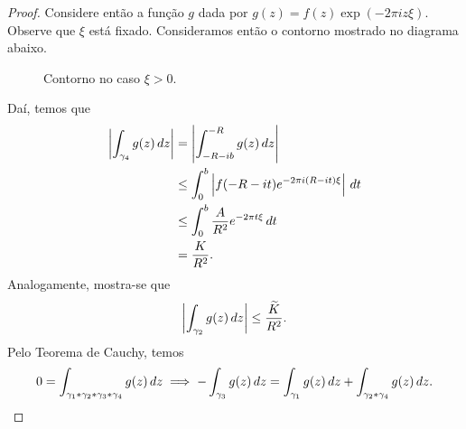 \begin{proof}
            Considere então a função $g$ dada por $g(z) = f(z)\exp(-2\pi iz\xi)$. Observe que $\xi$
            está fixado. Consideramos então o contorno mostrado no diagrama abaixo.
            \begin{figure}[H]
				\centering 
				\caption{Contorno no caso $\xi > 0$.}
			\end{figure}
            Daí, temos que
            \begin{align*}
                \left|\int_{\gamma_4} g(z) \, dz\right| &= \left|\int_{-R-ib}^{-R} g(z) \, dz\right| \\
                                                        &\leq \int_0^b \left| f(-R-it)e^{-2\pi i(R-it)\xi}
                                                        \right|\, dt \\
                                                        &\leq \int_0^b \frac{A}{R^2}e^{-2\pi t\xi} \, dt \\
                                                        &= \frac{K}{R^2}.
            \end{align*}
            Analogamente, mostra-se que
            \begin{equation*}
                \left|\int_{\gamma_2} g(z) \, dz\right| \leq \frac{\widetilde{K}}{R^2}.
            \end{equation*}
            Pelo Teorema de Cauchy, temos
            \begin{align*}
                0 = \int_{\gamma_1*\gamma_2*\gamma_3*\gamma_4} g(z) \, dz 
                \implies -\int_{\gamma_3} g(z) \, dz = \int_{\gamma_1} g(z) \, dz 
                                                     + \int_{\gamma_2*\gamma_4} g(z) \, dz.
            \end{align*}

\end{proof}

